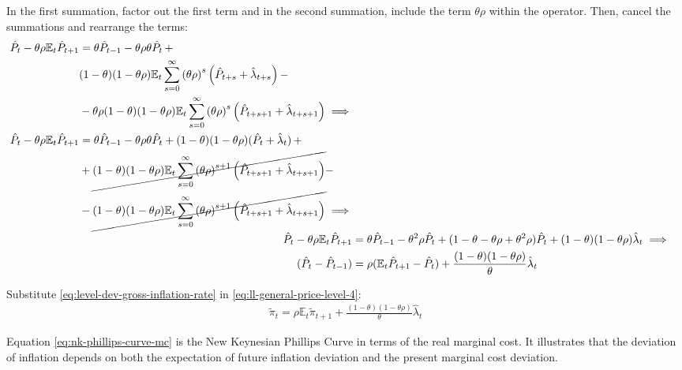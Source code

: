 \documentclass[
	12pt, 
	]{article}
\numberwithin{equation}{section}
\newcommand{\E}[1][t]{{\mathbb{E}_{#1}}}
\theoremstyle{definition}
\theoremstyle{plain}
\theoremstyle{plain}
\theoremstyle{plain}
\begin{document}
In the first summation, factor out the first term and in the second summation, include the term $\theta \rho$ within the operator. Then, cancel the summations and rearrange the terms:
\begin{align}
	\begin{split}
		\hat{P}_t - \theta \rho \E \hat{P}_{t+1} &= \theta \hat{P}_{t-1} - \theta \rho \theta \hat{P}_t \, + \\
		& (1-\theta) (1- \theta \rho) \E \sum_{s=0}^{\infty} \left( \theta \rho \right)^s \left( \hat{P}_{t+s} + \hat{\lambda}_{t+s} \right) -
	\\
		& - \theta \rho (1-\theta) (1- \theta \rho) \E \sum_{s=0}^{\infty} \left( \theta \rho \right)^s \left( \hat{P}_{t+s+1} + \hat{\lambda}_{t+s+1} \right) \implies \nonumber 
	\end{split} \\
	\begin{split}
		\hat{P}_t - \theta \rho \E \hat{P}_{t+1} &= \theta \hat{P}_{t-1} - \theta \rho \theta \hat{P}_t + (1-\theta) (1- \theta \rho) (\hat{P}_t + \hat{\lambda}_t) \, + 
	\\
		& + \cancel{(1-\theta) (1- \theta \rho) \E \sum_{s=0}^{\infty} \left( \theta \rho \right)^{s+1} \left( \hat{P}_{t+s+1} + \hat{\lambda}_{t+s+1} \right)} -
	\\
		& - \cancel{(1-\theta) (1- \theta \rho) \E \sum_{s=0}^{\infty} \left( \theta \rho \right)^{s+1} \left( \hat{P}_{t+s+1} + \hat{\lambda}_{t+s+1} \right)} \implies \nonumber 
	\end{split} \\
		\hat{P}_t - \theta \rho \E \hat{P}_{t+1} &= \theta \hat{P}_{t-1} - \theta^2 \rho \hat{P}_t + (1- \theta -\theta \rho + \theta^2 \rho) \hat{P}_t + (1-\theta) (1- \theta \rho) \hat{\lambda}_t \implies \nonumber \\
		(\hat{P}_t - \hat{P}_{t-1}) &= \rho (\E \hat{P}_{t+1} - \hat{P}_t) + \frac{(1-\theta) (1- \theta \rho)}{\theta} \hat{\lambda}_t
	\label{eq:ll-general-price-level-4}
\end{align}

Substitute \ref{eq:level-dev-gross-inflation-rate} in \ref{eq:ll-general-price-level-4}:
\begin{align}
	\widetilde{\pi}_t = \rho \E \widetilde{\pi}_{t+1} + \frac{(1-\theta) (1- \theta \rho)}{\theta} \hat{\lambda}_t \label{eq:nk-phillips-curve-mc}
\end{align}

Equation \ref{eq:nk-phillips-curve-mc} is the New Keynesian Phillips Curve in terms of the real marginal cost. It illustrates that the deviation of inflation depends on both the expectation of future inflation deviation and the present marginal cost deviation.
\end{document}
